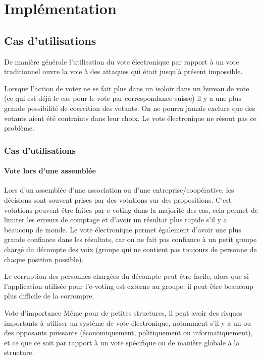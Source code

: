 \documentclass[../report]{subfiles}
\begin{document}
\part{Implémentation}

\chapter{Cas d'utilisations}\label{chap:usecase}

De manière générale l'utilisation du vote électronique par rapport à un vote traditionnel ouvre la voie à 
des attaques qui était jusqu'à présent impossible. 

Lorsque l'action de voter ne se fait plus dans un isoloir dans un bureau de vote (ce qui est déjà le cas
pour le vote par correspondance suisse) il y a une plus grande possibilité de coercition des votants.
On ne pourra jamais exclure que des votants aient été contraints dans leur choix. 
Le vote électronique ne résout pas ce problème.

\section{Cas d'utilisations}
\subsection{Vote lors d'une assemblée}

Lors d'un assemblée d'une association ou d'une entreprise/coopérative, les décisions sont souvent prises par
des votations sur des propositions.
C'est votations peuvent être faites par e-voting dans la majorité des cas, cela permet de limiter les erreurs 
de comptage et d'avoir un résultat plus rapide s'il y a beaucoup de monde.
Le vote électronique permet également d'avoir une plus grande confiance dans les résultats, car on ne fait pas 
confiance à un petit groupe chargé du décompte des voix (groupe qui ne contient pas toujours de personne de 
chaque position possible).

Le corruption des personnes chargées du décompte peut être facile, alors que si l'application utilisée pour
l'e-voting est externe au groupe, il peut être beaucoup plus difficile de la corrompre.

\begin{important}{Vote d'importance}
	Même pour de petites structures, il peut avoir des risques importants à utiliser un système de vote électronique, 
	notamment s'il y a un ou des opposants puissants (économiquement, politiquement ou informatiquement), et ce que
	ce soit par rapport à un vote spécifique ou de manière globale à la structure.
\end{important}
\end{document}
